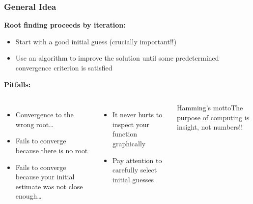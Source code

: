   \begin{frame}[fragile]
    \frametitle{General Idea}
  
    \textbf{Root finding proceeds by iteration:}
    \begin{itemize}
      \item Start with a good initial guess (crucially important!!)
      \item Use an algorithm to improve the solution until some predetermined convergence criterion is satisfied
    \end{itemize}
  
    \textbf{Pitfalls:}
    \begin{columns}
      \begin{itemize}
        \item Convergence to the wrong root…
        \item Fails to converge because there is no root
        \item Fails to converge because your initial estimate was not close enough…
      \end{itemize}
  
      \begin{itemize}
        \item It never hurts to inspect your function graphically
        \item Pay attention to carefully select initial guesses
      \end{itemize}
        \begin{block}{Hamming’s motto}The purpose of computing is insight, not numbers!!\end{block}
      \end{columns}
  \end{frame}
  
